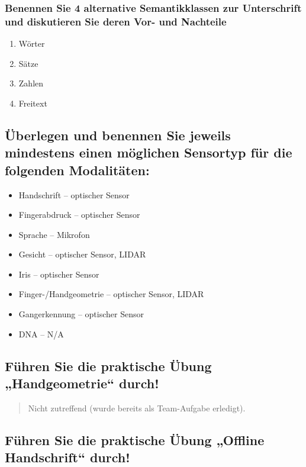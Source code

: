 \documentclass{article}
\newcommand{\annotation}[1]{
    \begin{quote}
    	\begin{textit}{#1}\end{textit}
    \end{quote}
}
\begin{document}
\subsubsection{Benennen Sie 4 alternative Semantikklassen zur Unterschrift und diskutieren Sie deren Vor- und Nachteile}

\begin{enumerate}
	\item Wörter
	\item Sätze
	\item Zahlen
	\item Freitext
\end{enumerate}

\subsection{Überlegen und benennen Sie jeweils mindestens einen möglichen Sensortyp für die folgenden Modalitäten:}

\begin{itemize}
	\item Handschrift – optischer Sensor
	\item Fingerabdruck – optischer Sensor
	\item Sprache – Mikrofon
	\item Gesicht – optischer Sensor, LIDAR
	\item Iris – optischer Sensor
	\item Finger-/Handgeometrie – optischer Sensor, LIDAR
	\item Gangerkennung – optischer Sensor
	\item DNA – N/A
\end{itemize}

\subsection{Führen Sie die praktische Übung „Handgeometrie“ durch!}
\annotation{Nicht zutreffend (wurde bereits als Team-Aufgabe erledigt).}

\subsection{Führen Sie die praktische Übung „Offline Handschrift“ durch!}
\end{document}
